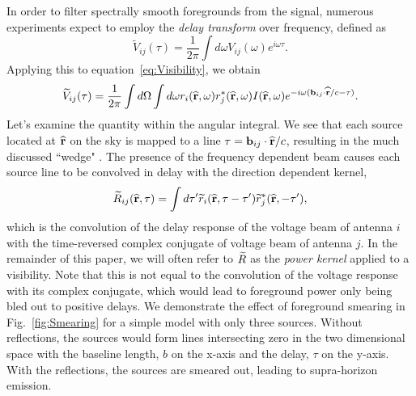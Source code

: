 \documentclass[twocolumn]{emulateapj}
\begin{document}
In order to filter spectrally smooth foregrounds from the signal, numerous experiments expect to employ the {\it delay transform} over frequency, defined as \citep{Parsons:2012}
\begin{equation}
\widetilde{V}_{ij}(\tau) = \frac{1}{2 \pi} \int d \omega V_{ij}(\omega) e^{i \omega \tau }.
\end{equation}
Applying this to equation~\ref{eq:Visibility}, we obtain
\begin{equation}
\widetilde{V}_{ij}(\tau)= \frac{1}{2\pi} \int d \Omega \int d \omega r_i(\bl,\omega) r_j^*(\bl,\omega)  I(\bl,\omega) e^{-i \omega ( \bb_{ij} \cdot \bl /c - \tau)}.
\end{equation}
Let's examine the quantity within the angular integral. We see that each source located at $\widehat{\bf r}$ on the sky is mapped to a line $\tau ={\bf b}_{ij}\cdot \widehat{\bf r}/c$, resulting in the much discussed ``wedge" \citep{Datta:2010,Vedantham:2012,Parsons:2012,Morales:2012,Thyagarajan:2013,Liu:2014a,Liu:2014b}. The presence of the frequency dependent beam causes each source line to be convolved in delay with the direction dependent kernel,
\begin{equation}\label{eq:Kernel}
\ftR_{ij}(\bl,\tau) = \int d  \tau' \ftr_i(\bl,\tau - \tau') \ftr^*_j(\bl,-\tau'),
\end{equation}
which is the convolution of the delay response of the voltage beam of antenna $i$ with the time-reversed complex conjugate of voltage beam of antenna $j$. In the remainder of this paper, we will often refer to ${\widetilde{R}}$ as the {\it power kernel} applied to a visibility. Note that this is not equal to the convolution of the voltage response with its complex conjugate, which would lead to foreground power only being bled out to positive delays. We demonstrate the effect of foreground smearing in Fig.~\ref{fig:Smearing} for a simple model with only three sources. Without reflections, the sources would form lines intersecting zero in the two dimensional space with the baseline length, $b$ on the x-axis and the delay, $\tau$ on the y-axis. With the reflections, the sources are smeared out, leading to supra-horizon emission. 
\end{document}
